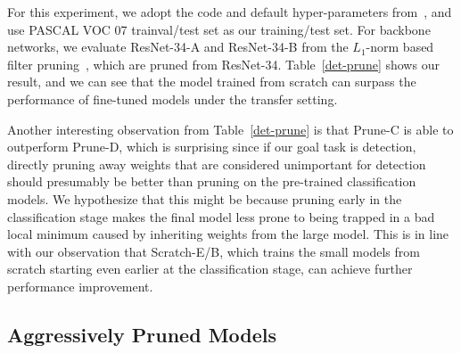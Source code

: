 For this experiment, we adopt the code and default hyper-parameters from~\cite{jjfaster2rcnn}, and use PASCAL VOC 07 trainval/test set as our training/test set. For backbone networks, we evaluate ResNet-34-A and ResNet-34-B from the $L_1$-norm based filter pruning~\cite{li2016pruning}, which are pruned from ResNet-34.
Table~\ref{det-prune} shows our result, and we can see that the model trained from scratch can surpass the performance of fine-tuned models under the transfer setting.


Another interesting observation from Table~\ref{det-prune} is that Prune-C is able to outperform Prune-D, which is surprising since if our goal task is detection, directly pruning away weights that are considered unimportant for detection should presumably be better than pruning on the pre-trained classification models. We hypothesize that this might be because pruning early in the classification stage makes the final model less prone to being trapped in a bad local minimum caused by inheriting weights from the large model. This is in line with our observation that Scratch-E/B, which trains the small models from scratch starting even earlier at the classification stage, can achieve further performance improvement.

\subsection{Aggressively Pruned Models}

